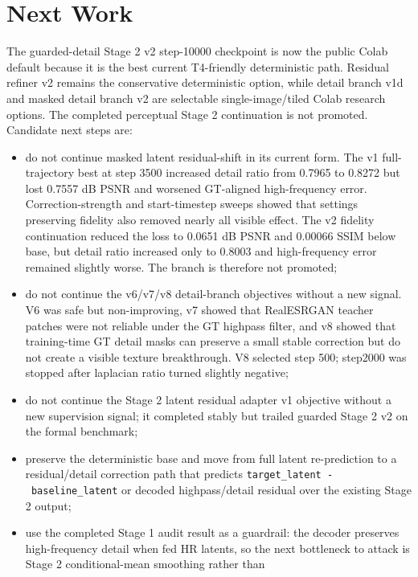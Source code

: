 \documentclass[
  10pt,
]{article}
\begin{document}
\hypertarget{next-work}{%
\section{Next Work}\label{next-work}}

The guarded-detail Stage 2 v2 step-10000 checkpoint is now the public
Colab default because it is the best current T4-friendly deterministic
path. Residual refiner v2 remains the conservative deterministic option,
while detail branch v1d and masked detail branch v2 are selectable
single-image/tiled Colab research options. The completed perceptual
Stage 2 continuation is not promoted. Candidate next steps are:

\begin{itemize}
\item
  do not continue masked latent residual-shift in its current form. The
  v1 full-trajectory best at step 3500 increased detail ratio from
  0.7965 to 0.8272 but lost 0.7557 dB PSNR and worsened GT-aligned
  high-frequency error. Correction-strength and start-timestep sweeps
  showed that settings preserving fidelity also removed nearly all
  visible effect. The v2 fidelity continuation reduced the loss to
  0.0651 dB PSNR and 0.00066 SSIM below base, but detail ratio increased
  only to 0.8003 and high-frequency error remained slightly worse. The
  branch is therefore not promoted;
\item
  do not continue the v6/v7/v8 detail-branch objectives without a new
  signal. V6 was safe but non-improving, v7 showed that RealESRGAN
  teacher patches were not reliable under the GT highpass filter, and v8
  showed that training-time GT detail masks can preserve a small stable
  correction but do not create a visible texture breakthrough. V8
  selected step 500; step2000 was stopped after laplacian ratio turned
  slightly negative;
\item
  do not continue the Stage 2 latent residual adapter v1 objective
  without a new supervision signal; it completed stably but trailed
  guarded Stage 2 v2 on the formal benchmark;
\item
  preserve the deterministic base and move from full latent
  re-prediction to a residual/detail correction path that predicts
  \texttt{target\_latent\ -\ baseline\_latent} or decoded
  highpass/detail residual over the existing Stage 2 output;
\item
  use the completed Stage 1 audit result as a guardrail: the decoder
  preserves high-frequency detail when fed HR latents, so the next
  bottleneck to attack is Stage 2 conditional-mean smoothing rather than

\end{itemize}
\end{document}
